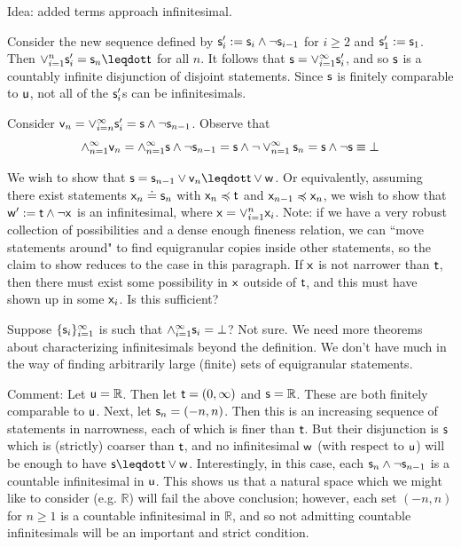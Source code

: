 \documentclass[10pt, onecolumn, nofootinbib]{revtex4-2}
\begin{document}
Idea: added terms approach infinitesimal. 

Consider the new sequence defined by $\stmt'_i := \stmt_i \AND \NOT\stmt_{i-1}$ for $i\geq2$ and $\stmt'_1 := \stmt_1$. Then $\OR_{i=1}^n\stmt'_i = \stmt_n\finer\stmt[t]$ for all $n$. It follows that $\stmt = \OR_{i=1}^{\infty}\stmt'_i$, and so $\stmt$ is a countably infinite disjunction of disjoint statements. Since $\stmt$ is finitely comparable to $\stmt[u]$, not all of the $\stmt_i'$s can be infinitesimals. 

Consider $\stmt[v]_n = \OR_{i=n}^{\infty}\stmt'_i = \stmt \AND\NOT\stmt_{n-1}$. Observe that $$\AND_{n=1}^{\infty}\stmt[v]_n = \AND_{n=1}^{\infty}\stmt\AND\NOT\stmt_{n-1} = \stmt\AND\NOT\OR_{n=1}^{\infty}\stmt_n = \stmt\AND\NOT\stmt \equiv \impossibility$$

We wish to show that $\stmt = \stmt_{n-1}\OR\stmt[v]_n\finer \stmt[t]\OR \stmt[w]$. Or equivalently, assuming there exist statements $\stmt[x]_n\eqgran\stmt_n$ with $\stmt[x]_n\narrower\stmt[t]$ and $\stmt[x]_{n-1}\narrower\stmt[x]_n$, we wish to show that $\stmt[w]' := \stmt[t]\AND\NOT\stmt[x]$ is an infinitesimal, where $\stmt[x]=\OR_{i=1}^n\stmt[x]_i$. Note: if we have a very robust collection of possibilities and a dense enough fineness relation, we can ``move statements around" to find equigranular copies inside other statements, so the claim to show reduces to the case in this paragraph. If $\stmt[x]$ is not narrower than $\stmt[t]$, then there must exist some possibility in $\stmt[x]$ outside of $\stmt[t]$, and this must have shown up in some $\stmt[x]_i$. Is this sufficient? 

Suppose $\{\stmt_i\}_{i=1}^{\infty}$ is such that $\AND_{i=1}^{\infty}\stmt_i = \impossibility$? Not sure. We need more theorems about characterizing infinitesimals beyond the definition. We don't have much in the way of finding arbitrarily large (finite) sets of equigranular statements. 

Comment: Let $\stmt[u] = \mathbb{R}$. Then let $\stmt[t] = (0,\infty)$ and $\stmt = \mathbb{R}$. These are both finitely comparable to $\stmt[u]$. Next, let $\stmt_n = (-n,n)$. Then this is an increasing sequence of statements in narrowness, each of which is finer than $\stmt[t]$. But their disjunction is $\stmt$ which is (strictly) coarser than $\stmt[t]$, and no infinitesimal $\stmt[w]$ (with respect to $\stmt[u]$) will be enough to have $\stmt\finer\stmt[t]\OR \stmt[w]$. Interestingly, in this case, each $\stmt_n\AND\NOT\stmt_{n-1}$ is a countable infinitesimal in $\stmt[u]$. This shows us that a natural space which we might like to consider (e.g. $\mathbb{R}$) will fail the above conclusion; however, each set $(-n,n)$ for $n\geq1$ is a countable infinitesimal in $\mathbb{R}$, and so not admitting countable infinitesimals will be an important and strict condition. 
\end{document}
